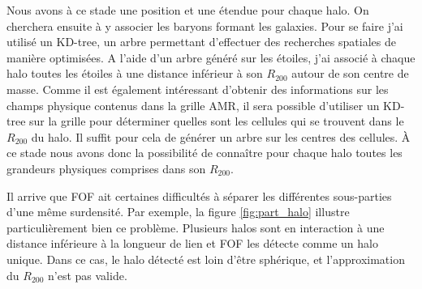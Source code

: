 Nous avons à ce stade une position et une étendue pour chaque halo.
On cherchera ensuite à y associer les baryons formant les galaxies.
Pour se faire j'ai utilisé un KD-tree, un arbre permettant d'effectuer des recherches spatiales de manière optimisées.
A l'aide d'un arbre généré sur les étoiles, j'ai associé à chaque halo toutes les étoiles à une distance inférieur à son $R_{200}$ autour de son centre de masse.
Comme il est également intéressant d'obtenir des informations sur les champs physique contenus dans la grille \ac{AMR}, il sera possible d'utiliser un KD-tree sur la grille pour déterminer quelles sont les cellules qui se trouvent dans le $R_{200}$ du halo.
Il suffit pour cela de générer un arbre sur les centres des cellules.%
À ce stade nous avons donc la possibilité de connaître pour chaque halo toutes les grandeurs physiques comprises dans son $R_{200}$.


%

Il arrive que \ac{FOF} ait certaines difficultés à séparer les différentes sous-parties d'une même surdensité.
Par exemple, la figure \ref{fig:part_halo} illustre particulièrement bien ce problème.
Plusieurs halos sont en interaction à une distance inférieure à la longueur de lien et \ac{FOF} les détecte comme un halo unique. 
Dans ce cas, le halo détecté est loin d'être sphérique, et l'approximation du $R_{200}$ n'est pas valide.


